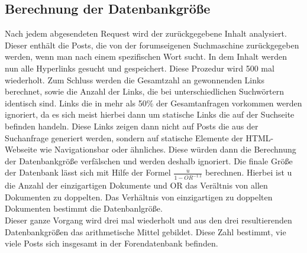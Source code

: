 \subsection{Berechnung der Datenbankgröße}
Nach jedem abgesendeten Request wird der zurückgegebene Inhalt analysiert. Dieser enthält die Posts, die von der 
forumseigenen Suchmaschine zurückgegeben werden, wenn man nach einem spezifischen Wort sucht. In dem Inhalt werden nun alle Hyperlinks gesucht und gespeichert. Diese Prozedur wird 500 mal wiederholt. Zum Schluss werden die Gesamtzahl an gewonnenden Links berechnet, sowie die Anzahl der Links, die bei unterschiedlichen Suchwörtern identisch sind. Links die in mehr als 50\% der Gesamtanfragen vorkommen werden ignoriert, da es sich meist hierbei dann um statische Links die auf der Suchseite befinden handeln. Diese Links zeigen dann nicht auf Posts die aus der Suchanfrage generiert werden, sondern auf statische Elemente der HTML-Webseite wie Navigationsbar oder ähnliches. Diese würden dann die Berechnung der Datenbankgröße verfälschen und werden deshalb ignoriert.
Die finale Größe der Datenbank lässt sich mit Hilfe der Formel \(\frac{u}{1-OR^{-1.1}}\) \cite{lu2008efficient}  berechnen. Hierbei ist u die Anzahl der einzigartigen Dokumente und OR das Verältnis von allen Dokumenten zu doppelten. Das Verhältnis von einzigartigen zu doppelten Dokumenten bestimmt die Datenbanlgröße.\\
Dieser ganze Vorgang wird drei mal wiederholt und aus den drei resultierenden Datenbankgrößen das arithmetische Mittel gebildet. Diese Zahl bestimmt, vie viele Posts sich insgesamt in der Forendatenbank befinden.

\newpage